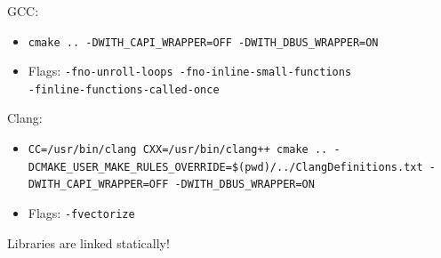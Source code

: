 \documentclass{beamer}
\newcommand{\codeinline}[1] {\texttt{\small #1}}
\begin{document}
\begin{frame}
\frametitle{\secname}

GCC:
\begin{itemize} 
\item \codeinline{cmake .. -DWITH\_CAPI\_WRAPPER=OFF -DWITH\_DBUS\_WRAPPER=ON} 
\item Flags: \codeinline{-fno-unroll-loops -fno-inline-small-functions \\-finline-functions-called-once}
\end{itemize}
Clang: 
\begin{itemize}
\item \codeinline{CC=/usr/bin/clang CXX=/usr/bin/clang++ cmake .. -DCMAKE\_USER\_MAKE\_RULES\_OVERRIDE=\$(pwd)/../ClangDefinitions.txt -DWITH\_CAPI\_WRAPPER=OFF -DWITH\_DBUS\_WRAPPER=ON}
\item Flags: \codeinline{-fvectorize}
\end{itemize}

Libraries are linked statically!
\end{frame}
\end{document}
